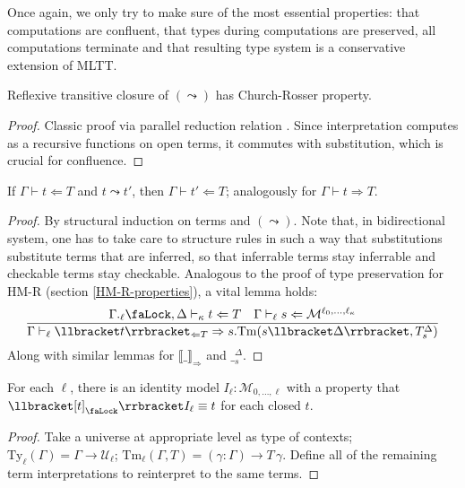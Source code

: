 Once again, we only try to make sure of the most
essential properties: that computations are confluent,
that types during computations are preserved, all
computations terminate and that resulting type system
is a conservative extension of MLTT.

\begin{theorem}
    Reflexive transitive closure of $(\leadsto)$ has
    Church-Rosser property.
\end{theorem}
\begin{proof}
    Classic proof via parallel reduction relation
    \cite{CRproof}. Since interpretation computes as a
    recursive functions on open terms, it commutes with
    substitution, which is crucial for confluence.
\end{proof}

\begin{theorem}
    If $\Gamma\vdash t\Leftarrow T$ and $t\leadsto t'$,
    then $\Gamma\vdash t'\Leftarrow T$; analogously for
    $\Gamma\vdash t\Rightarrow T$.
\end{theorem}
\begin{proof}
    By structural induction on terms and $(\leadsto)$.
    Note that, in bidirectional system, one has to take
    care to structure rules in such a way that
    substitutions substitute terms that are inferred, so
    that inferrable terms stay inferrable and checkable
    terms stay checkable.
    Analogous to the proof of type preservation for HM-R
    (section \ref{HM-R-properties}), a vital lemma
    holds:
    \[  \dfrac{
            \Gamma.{}_\ell\text{\faLock},\Delta
                \vdash_\kappa t\Leftarrow T
            \quad\Gamma\vdash_\ell s\Leftarrow
                \mathcal{M}^{\ell_0,\ldots,\ell_\kappa}
        }{\Gamma\vdash_\ell\llbracket t\rrbracket_{
            \Leftarrow T}\Rightarrow
            s.\mathrm{Tm}(s\llbracket\Delta\rrbracket,
                T_s^\Delta)}
    \]
    Along with similar lemmas for $\llbracket\_
    \rrbracket_\Rightarrow$ and $\__s^\Delta$.
\end{proof}

\begin{theorem}
    For each $\ell$, there is an identity model
    $I_\ell:\mathcal{M}_{0,\ldots,\ell}$ with a property
    that $\llbracket [t]_\text{\faLock} \rrbracket
    I_\ell \equiv t$ for each closed $t$.
\end{theorem}
\begin{proof}
    Take a universe at appropriate level as type of
    contexts; $\mathrm{Ty}_\ell(\Gamma)=
    \Gamma\to\mathcal{U}_\ell$;
    $\mathrm{Tm}_\ell(\Gamma, T)=(\gamma:\Gamma)\to
    T\,\gamma$. Define all of the remaining term
    interpretations to reinterpret to the same terms.
\end{proof}

